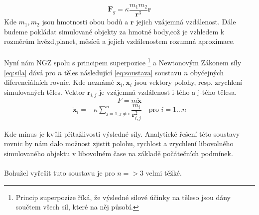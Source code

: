 \begin{equation}
	\boldsymbol{F}_g= \kappa \dfrac{m_1 m_2}{\boldsymbol{r}^3} {\boldsymbol{r}}
\end{equation}
Kde $ m_1,m_2 $ jsou hmotnosti obou bodů a $ \boldsymbol{r} $ jejich vzájemná vzdálenost.
Dále budeme pokládat simulované objekty za hmotné body,což je vzhledem k rozměrům hvězd,planet, měsíců a jejich vzdálenostem rozumná aproximace.
\paragraph{}
Nyní nám NGZ spolu s principem superpozice
\footnote{Princip superpozize říká, že výsledné silové účinky na těleso jsou dány součtem všech sil, které na něj působí.}
 a Newtonovým Zákonem síly \eqref{eq:sila} dává pro $ n $ těles následující \eqref{eq:soustava} soustavu  $ n $ obyčejných diferenciálních rovnic. 
 Kde neznámé $ \boldsymbol {x}_i, \boldsymbol{\ddot x}_i $ jsou vektory polohy, resp. zrychlení simulovaných těles. Vektor $\boldsymbol r_{i,j} $ je vzájemná vzdálenost i-tého a j-tého tělesa.
\begin{equation}
F= m  \boldsymbol {\ddot x}
\label{eq:sila}
\end{equation}
\begin{align}\label{eq:soustava}
\boldsymbol {\ddot x}_i = - \kappa \sum_{j=1,j \neq i}^{n}\dfrac{m_i}
{\boldsymbol{r}_{i,j}^2} 
\quad \text{pro } i=1 \dots n
\end{align}

Kde mínus je kvůli přitažlivosti výsledné síly.
Analytické řešení této soustavy rovnic by nám dalo možnost zjistit polohu, rychlost a zrychlení libovolného simulovaného objektu v libovolném čase na základě počátečních podmínek.
\paragraph{}
Bohužel vyřešit tuto soustavu je pro $ n=>3 $ velmi těžké.

